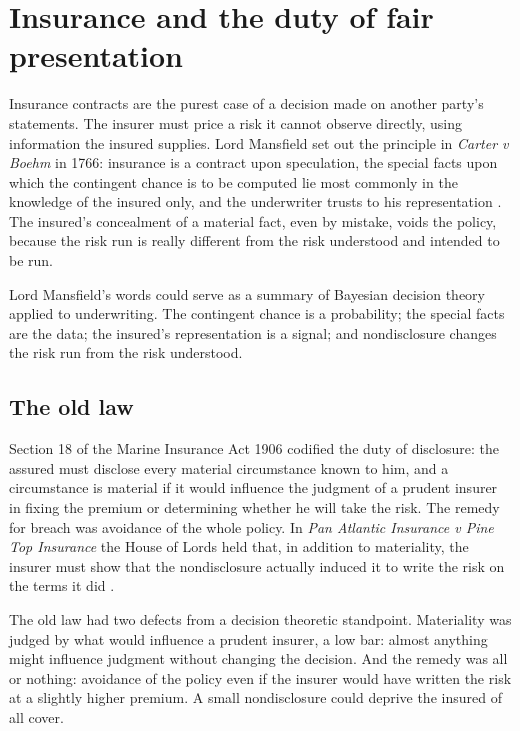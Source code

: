 \section{Insurance and the duty of fair presentation}

Insurance contracts are the purest case of a decision made on another party's statements. The insurer must price a risk it cannot observe directly, using information the insured supplies. Lord Mansfield set out the principle in \emph{Carter v Boehm} in 1766: insurance is a contract upon speculation, the special facts upon which the contingent chance is to be computed lie most commonly in the knowledge of the insured only, and the underwriter trusts to his representation \citep{carter1766}. The insured's concealment of a material fact, even by mistake, voids the policy, because the risk run is really different from the risk understood and intended to be run.

Lord Mansfield's words could serve as a summary of Bayesian decision theory applied to underwriting. The contingent chance is a probability; the special facts are the data; the insured's representation is a signal; and nondisclosure changes the risk run from the risk understood.

\subsection{The old law}

Section 18 of the Marine Insurance Act 1906 codified the duty of disclosure: the assured must disclose every material circumstance known to him, and a circumstance is material if it would influence the judgment of a prudent insurer in fixing the premium or determining whether he will take the risk. The remedy for breach was avoidance of the whole policy. In \emph{Pan Atlantic Insurance v Pine Top Insurance} the House of Lords held that, in addition to materiality, the insurer must show that the nondisclosure actually induced it to write the risk on the terms it did \citep{panatlantic1995}.

The old law had two defects from a decision theoretic standpoint. Materiality was judged by what would influence a prudent insurer, a low bar: almost anything might influence judgment without changing the decision. And the remedy was all or nothing: avoidance of the policy even if the insurer would have written the risk at a slightly higher premium. A small nondisclosure could deprive the insured of all cover.

